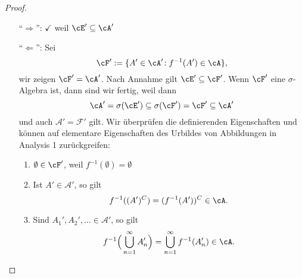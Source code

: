 \begin{proof}\label{messbErzeuger}\abs
	\begin{itemize}
		\item [\enquote{$\Rightarrow$}:] $\checkmark$ weil $\cE' \subseteq \cA'$
		\item [\enquote{$\Leftarrow$}:] Sei \[ \cF': = \{ A' \in \cA' \! : f^{-1}(A') \in \cA \}, \] wir zeigen $\cF' = \cA'$. Nach Annahme gilt $\cE' \subseteq \cF'$. Wenn $\cF'$ eine $\sigma$-Algebra ist, dann sind wir fertig, weil dann
		\[ \cA' = \sigma(\cE') \subseteq \sigma(\cF') = \cF' \subseteq \cA'\] 
		und auch $\mathcal A'=\mathcal F'$ gilt. Wir überprüfen die definierenden Eigenschaften und k\"onnen auf elementare Eigenschaften des Urbildes von Abbildungen in Analysis 1 zur\"uckgreifen:
		\begin{enumerate}[label=(\roman*)]
			\item $\emptyset \in \cF'$, weil $f^{-1} (\emptyset) = \emptyset$
			\item Ist $A'\in \mathcal A'$, so gilt  \[f^{-1}((A')^C) = (f^{-1}(A'))^C \in \cA.\]
			\item Sind $A_1', A_2', ... \in \mathcal A'$, so gilt  \[ f^{-1} \Big(\bigcup\limits_{n = 1}^{\infty} A'_n \Big) = \bigcup\limits_{n = 1}^{\infty} f^{-1}(A'_n) \in \cA. \]
		\end{enumerate}
	\end{itemize}
\end{proof}